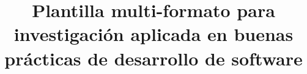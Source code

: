 \documentclass[man]{apa7}
\title{Plantilla multi-formato para investigación aplicada en buenas prácticas de desarrollo de software}
\begin{document}
\maketitle










\nocite{*}
\printbibliography
\end{document}

